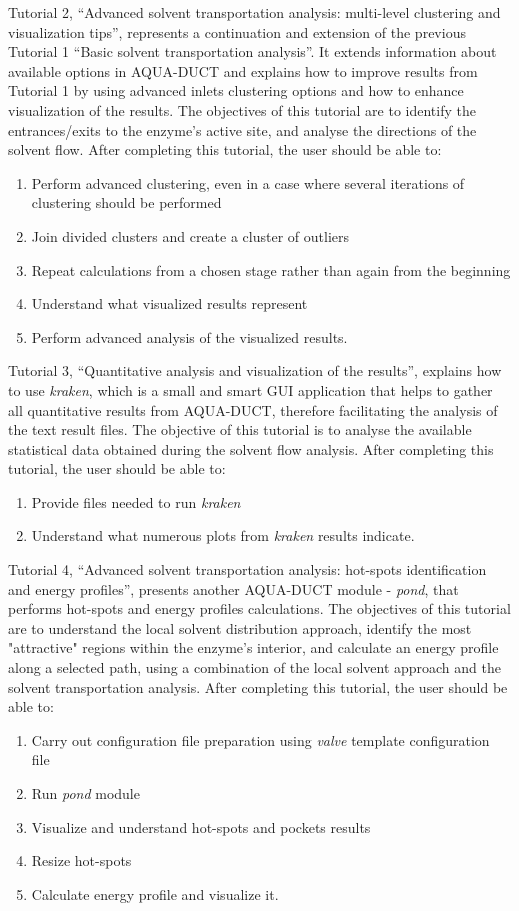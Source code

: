 \documentclass[9pt,tutorial]{livecoms}
\begin{document}
Tutorial 2, “Advanced solvent transportation analysis: multi-level clustering and visualization tips”, represents a continuation and extension of the previous Tutorial 1 “Basic solvent transportation analysis”. It extends information about available options in AQUA-DUCT and explains how to improve results from Tutorial 1 by using advanced inlets clustering options and how to enhance visualization of the results. The objectives of this tutorial are to identify the entrances/exits to the enzyme's active site, and analyse the directions of the solvent flow. After completing this tutorial, the user should be able to:
\begin{enumerate}
  \item Perform advanced clustering, even in a case where several iterations of clustering should be performed
  \item Join divided clusters and create a cluster of outliers
  \item Repeat calculations from a chosen stage rather than again from the beginning
  \item Understand what visualized results represent
  \item Perform advanced analysis of the visualized results.
\end{enumerate}

Tutorial 3, “Quantitative analysis and visualization of the results”, explains how to use \textit{kraken}, which is a small and smart GUI application that helps to gather all quantitative results from AQUA-DUCT, therefore facilitating the analysis of the text result files. The objective of this tutorial is to analyse the available statistical data obtained during the solvent flow analysis. After completing this tutorial, the user should be able to:
\begin{enumerate}
  \item Provide files needed to run \textit{kraken}
  \item Understand what numerous plots from \textit{kraken} results indicate.
\end{enumerate}

Tutorial 4, “Advanced solvent transportation analysis: hot-spots identification and energy profiles”, presents another AQUA-DUCT module - \textit{pond}, that performs hot-spots and energy profiles calculations. The objectives of this tutorial are to understand the local solvent distribution approach, identify the most "attractive" regions within the enzyme's interior, and calculate an energy profile along a selected path, using a combination of the local solvent approach and the solvent transportation analysis. After completing this tutorial, the user should be able to:
\begin{enumerate}
  \item Carry out configuration file preparation using \textit{valve} template configuration file
  \item Run \textit{pond} module
  \item Visualize and understand hot-spots and pockets results
  \item Resize hot-spots
  \item Calculate energy profile and visualize it.
\end{enumerate}
\end{document}
